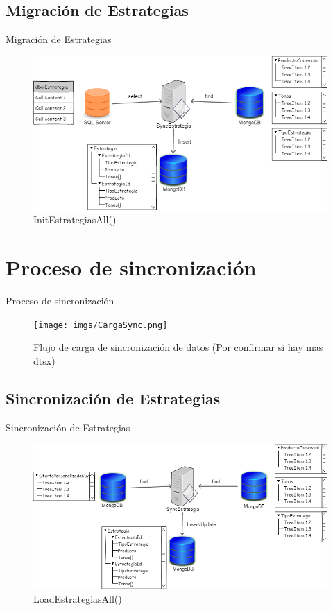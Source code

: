 \documentclass{bredelebeamer}
\begin{document}
\subsection{Migración de Estrategias}
\begin{frame}{Migración de Estrategias}
\begin{figure}
\centering
\includegraphics[scale=0.35]{imgs/Estrategia.png}
\caption{InitEstrategiasAll()}
\end{figure}
\end{frame}

\section{Proceso de sincronización}
\begin{frame}{Proceso de sincronización}
\begin{figure}
\centering
\texttt{[image: imgs/CargaSync.png]}
\caption{Flujo de carga de sincronización de datos (Por confirmar si hay mas dtsx)}
\end{figure}
\end{frame}

\subsection{Sincronización de Estrategias}
\begin{frame}{Sincronización de Estrategias}
\begin{figure}
\centering
\includegraphics[scale=0.35]{imgs/EstrategiaLoad.png}
\caption{LoadEstrategiasAll()}
\end{figure}
\end{frame}
\end{document}
